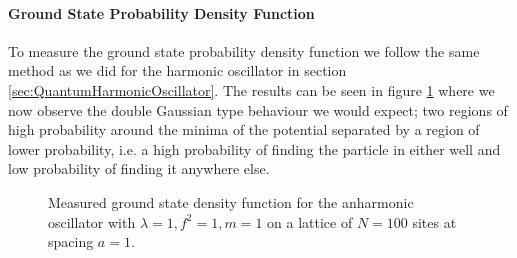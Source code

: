 \documentclass[12pt]{article}
\begin{document}
            \paragraph{Ground State Probability Density Function}
                To measure the ground state probability density function we follow the same method as we did for the harmonic oscillator in section \ref{sec:QuantumHarmonicOscillator}. The results can be seen in figure \ref{fig:AnharmonicWaveFunction} where we now observe the double Gaussian type behaviour we would expect; two regions of high probability around the minima of the potential separated by a region of lower probability, i.e. a high probability of finding the particle in either well and low probability of finding it anywhere else.
                \begin{figure}
                    \centering
                    \caption{Measured ground state density function for the anharmonic oscillator with $\lambda = 1, f^2=1,  m = 1$ on a lattice of $N=100$ sites at spacing $a = 1$.}
                    \label{fig:AnharmonicWaveFunction}
                \end{figure}
\end{document}
